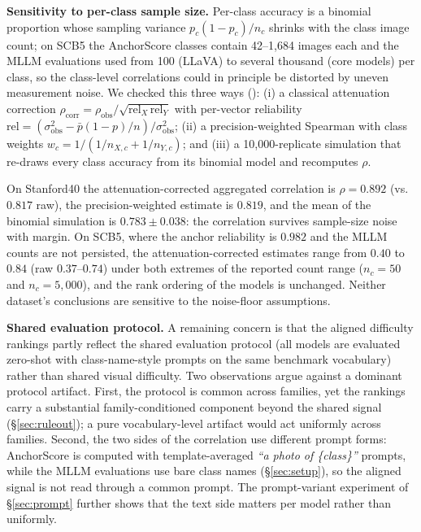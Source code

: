 \documentclass[a4paper,fleqn]{cas-sc}
\begin{document}
\textbf{Sensitivity to per-class sample size.}
Per-class accuracy is a binomial proportion whose sampling variance $p_c(1-p_c)/n_c$ shrinks with the class image count; on SCB5 the AnchorScore classes contain 42--1{,}684 images each and the MLLM evaluations used from 100 (LLaVA) to several thousand (core models) per class, so the class-level correlations could in principle be distorted by uneven measurement noise. We checked this three ways (): (i) a classical attenuation correction $\rho_{\mathrm{corr}} = \rho_{\mathrm{obs}}/\sqrt{\mathrm{rel}_X\,\mathrm{rel}_Y}$ with per-vector reliability $\mathrm{rel} = (\sigma^2_{\mathrm{obs}} - \bar{p}(1-p)/n)/\sigma^2_{\mathrm{obs}}$; (ii) a precision-weighted Spearman with class weights $w_c = 1/(1/n_{X,c} + 1/n_{Y,c})$; and (iii) a 10{,}000-replicate simulation that re-draws every class accuracy from its binomial model and recomputes $\rho$.

On Stanford40 the attenuation-corrected aggregated correlation is $\rho=0.892$ (vs.\ $0.817$ raw), the precision-weighted estimate is $0.819$, and the mean of the binomial simulation is $0.783 \pm 0.038$: the correlation survives sample-size noise with margin. On SCB5, where the anchor reliability is $0.982$ and the MLLM counts are not persisted, the attenuation-corrected estimates range from $0.40$ to $0.84$ (raw $0.37$--$0.74$) under both extremes of the reported count range ($n_c=50$ and $n_c=5{,}000$), and the rank ordering of the models is unchanged. Neither dataset's conclusions are sensitive to the noise-floor assumptions.

\textbf{Shared evaluation protocol.}
A remaining concern is that the aligned difficulty rankings partly reflect the shared evaluation protocol (all models are evaluated zero-shot with class-name-style prompts on the same benchmark vocabulary) rather than shared visual difficulty. Two observations argue against a dominant protocol artifact. First, the protocol is common across families, yet the rankings carry a substantial family-conditioned component beyond the shared signal (\S\ref{sec:ruleout}); a pure vocabulary-level artifact would act uniformly across families. Second, the two sides of the correlation use different prompt forms: AnchorScore is computed with template-averaged \emph{``a photo of \{class\}''} prompts, while the MLLM evaluations use bare class names (\S\ref{sec:setup}), so the aligned signal is not read through a common prompt. The prompt-variant experiment of \S\ref{sec:prompt} further shows that the text side matters per model rather than uniformly.
\end{document}
